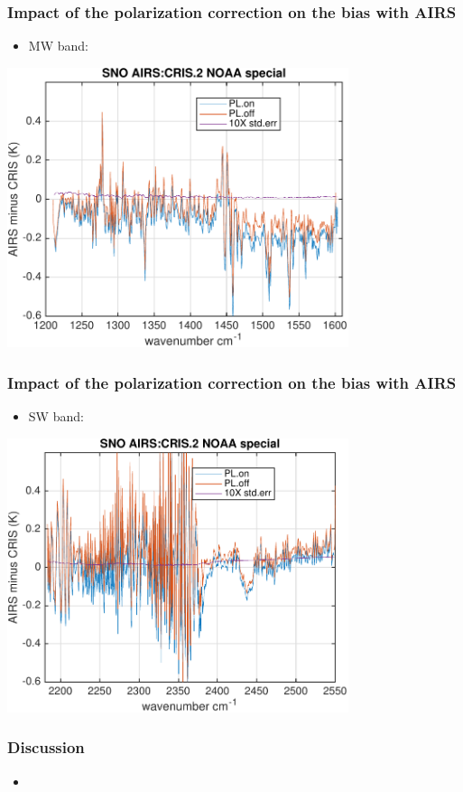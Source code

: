 \documentclass[10pt,t]{beamer} \usepackage[utf8]{inputenc}
\begin{document}
\begin{frame}
  \frametitle{Impact of the polarization correction on the bias with AIRS}
  \vspace{-0.125in} %
  \begin{itemize}
     \item MW band: 
  \end{itemize}
  
  \begin{center}
    \noindent\includegraphics[width=0.75\textwidth]{Figs/sno_airs_cris2_bias_spectrum_polz_mw.pdf}
  \end{center}
   
\end{frame}
\begin{frame}
  \frametitle{Impact of the polarization correction on the bias with AIRS}
  \vspace{-0.125in} %
  \begin{itemize}
     \item SW band: 
  \end{itemize}
  
  \begin{center}
    \noindent\includegraphics[width=0.75\textwidth]{Figs/sno_airs_cris2_bias_spectrum_polz_sw.pdf}
  \end{center}
   
\end{frame}
\begin{frame}
  \frametitle{Discussion}
  \vspace{-0.1 in}
  \begin{itemize}
     \item 
  \end{itemize}

  
\end{frame}
\end{document}
